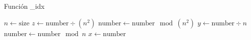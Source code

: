 \documentclass[oneside,spanish]{amsart}
\numberwithin{equation}{section}
\numberwithin{figure}{section}
\theoremstyle{definition}
\begin{document}
\begin{algorithm}
\caption{Función \_idx}
\begin{algorithmic}[1]
        \State $n \gets \text{size}$
        \State $z \gets \text{number} \div (n^2)$
        \State $\text{number} \gets \text{number} \mod (n^2)$
        \State $y \gets \text{number} \div n$
        \State $\text{number} \gets \text{number} \mod n$
        \State $x \gets \text{number}$
    \EndFunction
    \end{algorithmic}
\end{algorithm}
\end{document}
